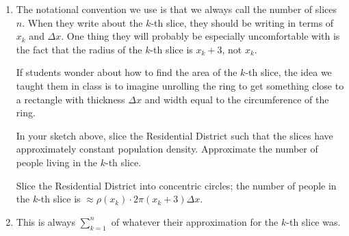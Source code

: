 \documentclass{article}
\begin{document}
\begin{enumerate}
\begin {enumerate}
  \item
    \begin{workshop}
      The notational convention we use is that we always call the number 
      of slices $n$.  When they write about the $k$-th slice, they should
      be writing in terms of $x_k$ and $\Delta x$.  One thing they will
      probably be especially uncomfortable with is the fact that the
      radius of the $k$-th slice is $x_k + 3$, not $x_k$.

      If students wonder about how to find the area of the $k$-th slice,
      the idea we taught them in class is to imagine unrolling the ring to
      get something close to a rectangle with thickness $\Delta x$ and
      width equal to the circumference of the ring.
    \end{workshop}

    \begin{problem}
      In your sketch above, slice the Residential District such that the slices have approximately constant population density. Approximate the number
      of people living in the $k$-th slice.
    \end{problem}

    \begin{solution}

            \begin{center}
        \end{center}
      Slice the Residential District into concentric circles; the number of people in the $k$-th slice is
      $\approx \rho(x_k) \cdot 2 \pi (x_k + 3) \Delta x$.
    \end{solution}
\pspace{\vfill}
  \item
    \begin{workshop}
      This is always $\displaystyle \sum_{k=1}^n$ of whatever their
      approximation for the $k$-th slice was.
    \end{workshop}


\end{enumerate}
\end{enumerate}
\end{document}
